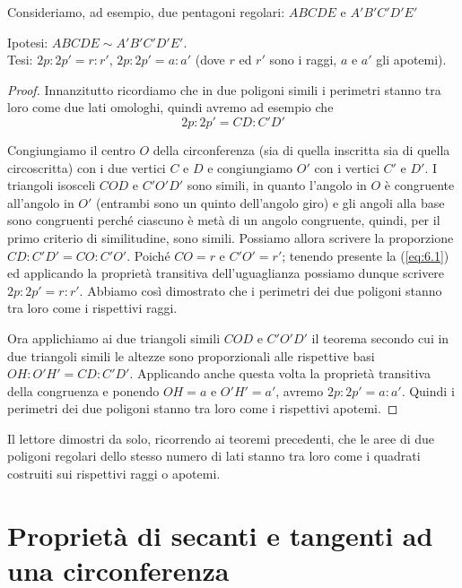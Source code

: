 Consideriamo, ad esempio, due pentagoni regolari: $ABCDE$ e $A'B'C'D'E'$

\noindent Ipotesi: $ABCDE\sim A'B'C'D'E'$.\\
Tesi: $2p : 2p' = r : r'$, $2p : 2p' = a : a'$ (dove $r$ ed $r'$ sono i raggi, $a$ e $a'$ gli apotemi).

\begin{figure*}[!htb]
	\centering
\end{figure*}

\begin{proof}
Innanzitutto ricordiamo che in due poligoni simili i perimetri stanno tra loro come due lati omologhi, quindi avremo ad esempio che
\begin{equation}\label{eq:6.1}
2p : 2p' = CD : C'D'
\end{equation}

Congiungiamo il centro $O$ della circonferenza (sia di quella inscritta sia di quella circoscritta) con i due vertici $C$ e $D$ e congiungiamo $O'$ con i vertici $C'$ e $D'$. I triangoli isosceli $COD$ e $C'O'D'$ sono simili, in quanto l'angolo in $O$ è congruente all'angolo in $O'$ (entrambi sono un quinto dell'angolo giro) e gli angoli alla base sono congruenti perché ciascuno è metà di un angolo congruente, quindi, per il primo criterio di similitudine, sono simili. Possiamo allora scrivere la proporzione $CD : C'D' = CO : C'O'$.
Poiché $CO = r$ e $C'O' = r'$; tenendo presente la (\ref{eq:6.1}) ed applicando la proprietà transitiva dell'uguaglianza possiamo dunque scrivere $2p : 2p' = r : r'$. Abbiamo così dimostrato che i perimetri dei due poligoni stanno tra loro come i rispettivi raggi.

Ora applichiamo ai due triangoli simili $COD$ e $C'O'D'$ il teorema secondo cui in due triangoli simili le altezze sono proporzionali alle rispettive basi $OH : O'H' = CD : C'D'$. Applicando anche questa volta la proprietà transitiva della congruenza e ponendo $OH = a$ e $O'H' =a'$, avremo $2p : 2p' = a : a'$.
Quindi i perimetri dei due poligoni stanno tra loro come i rispettivi apotemi.
\end{proof}

Il lettore dimostri da solo, ricorrendo ai teoremi precedenti, che le aree di due poligoni regolari dello stesso numero di lati stanno tra loro come i quadrati costruiti sui rispettivi raggi o apotemi.


\section{Proprietà di secanti e tangenti ad una circonferenza}

